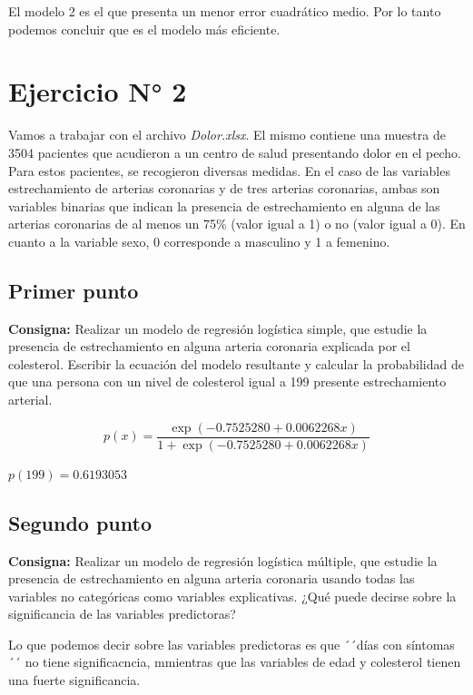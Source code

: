 \documentclass{article} %
\begin{document}
El modelo 2 es el que presenta un menor error cuadrático medio. Por lo tanto podemos concluir que es el modelo más eficiente.

\section{Ejercicio N° 2}

Vamos a trabajar con el archivo \textit{Dolor.xlsx}. El mismo contiene una muestra de 3504 pacientes que acudieron a un centro de salud presentando dolor en el pecho. Para estos pacientes, se recogieron diversas medidas. En el caso de las variables estrechamiento de arterias coronarias y de tres arterias coronarias, ambas son variables binarias que indican la presencia de estrechamiento en alguna de las arterias coronarias de al menos un 75\% (valor igual a 1) o no (valor igual a 0). En cuanto a la variable sexo, 0 corresponde a masculino y 1 a femenino.

\subsection{Primer punto}

\textbf{Consigna:} Realizar un modelo de regresión logística simple, que estudie la presencia de estrechamiento en alguna arteria coronaria explicada por el colesterol. Escribir la ecuación del modelo resultante y calcular la probabilidad de que una persona con un nivel de colesterol igual a 199 presente estrechamiento arterial.

\begin{equation}
p(x)=\frac{\exp(-0.7525280 + 0.0062268x)}{1 + \exp(-0.7525280 + 0.0062268x)}
\end{equation}

$p(199)=0.6193053$

\subsection{Segundo punto}

\textbf{Consigna:} Realizar un modelo de regresión logística múltiple, que estudie la presencia de estrechamiento en alguna arteria coronaria usando todas las variables no categóricas como variables explicativas. ¿Qué puede decirse sobre la significancia de las variables predictoras?

Lo que podemos decir sobre las variables predictoras es que ´´días con síntomas´´ no tiene significacncia, mmientras que las variables de edad y colesterol tienen una fuerte significancia.
\end{document}
